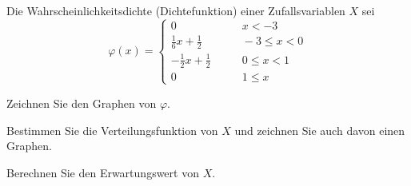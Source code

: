 Die Wahrscheinlichkeitsdichte (Dichtefunktion) einer Zufallsvariablen $X$
sei
\[
\varphi(x)=\begin{cases}
0&\qquad x<-3\\
\frac16x+\frac12&\qquad -3\le x<0\\
-\frac12x+\frac12&\qquad 0\le x< 1\\
0&\qquad 1\le x
\end{cases}
\]
\begin{teilaufgaben}
\item Zeichnen Sie den Graphen von $\varphi$.
\item Bestimmen Sie die Verteilungsfunktion von $X$ und zeichnen Sie
auch davon einen Graphen.
\item Berechnen Sie den Erwartungswert von $X$.
\end{teilaufgaben}

